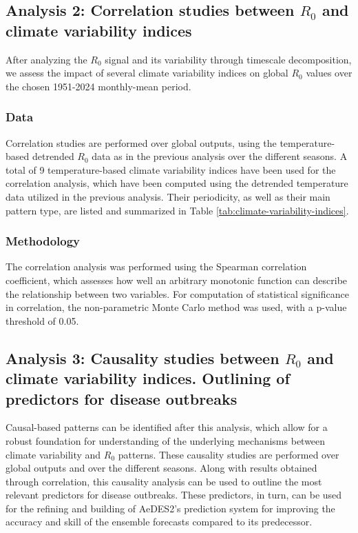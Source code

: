 \documentclass[10pt,twocolumn]{wlscirep}
\begin{document}
\subsection{Analysis 2: Correlation studies between $R_0$ and climate variability indices} \label{sec-methods-2}
After analyzing the $R_0$ signal and its variability through timescale decomposition, we assess the impact of several climate variability indices on global $R_0$ values over the chosen 1951-2024 monthly-mean period.

\subsubsection{Data} \label{sec-methods-2-data}

Correlation studies are performed over global outputs, using the temperature-based detrended $R_0$ data as in the previous analysis over the different seasons. A total of 9 temperature-based climate variability indices have been used for the correlation analysis, which have been computed using the detrended temperature data utilized in the previous analysis. Their periodicity, as well as their main pattern type, are listed and summarized in Table \ref{tab:climate-variability-indices}.


\subsubsection{Methodology} \label{sec-methods-2-methodology}

The correlation analysis was performed using the Spearman correlation coefficient, which assesses how well an arbitrary monotonic function can describe the relationship between two variables\cite{spearman_1904}. For computation of statistical significance in correlation, the non-parametric Monte Carlo method was used\cite{new_2000}, with a p-value threshold of 0.05.


\subsection{Analysis 3: Causality studies between $R_0$ and climate variability indices. Outlining of predictors for disease outbreaks} \label{sec-methods-3}

Causal-based patterns can be identified after this analysis, which allow for a robust foundation for understanding of the underlying mechanisms between climate variability and $R_0$ patterns. These causality studies are performed over global outputs and over the different seasons. Along with results obtained through correlation, this causality analysis can be used to outline the most relevant predictors for disease outbreaks. These predictors, in turn, can be used for the refining and building of AeDES2's prediction system for improving the accuracy and skill of the ensemble forecasts compared to its predecessor.
\end{document}
